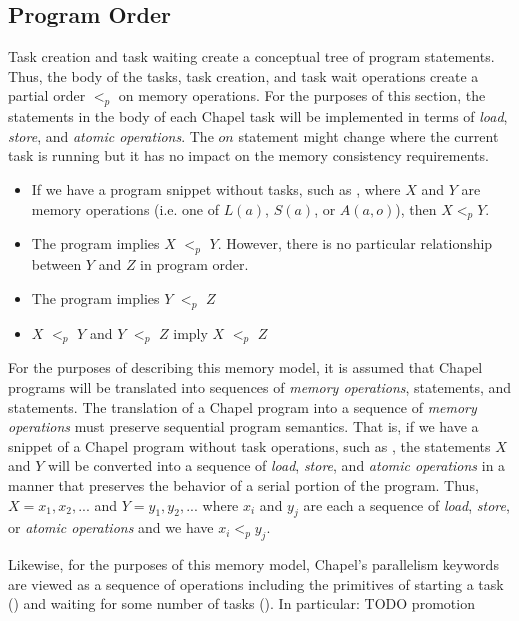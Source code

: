 \subsection{Program Order}
\label{program_order}

Task creation and task waiting create a conceptual tree of program
statements. Thus, the body of the tasks, task creation, and task wait
operations create a partial order $<_p$ on memory operations.  
For the purposes of this section, the statements in the body of each
Chapel task will be implemented in terms of \textit{load}, \textit{store}, and
\textit{atomic operations}. The $on$ statement might change where the current
task is running but it has no impact on the memory consistency requirements.
\begin{itemize}
  \item If we have a program snippet without tasks, such as ,
  where $X$ and $Y$ are memory operations (i.e. one of $L(a)$, $S(a)$, or
  $A(a,o)$), then $X <_p Y$.

  \item The program  implies $X$ $<_p$ $Y$.
  However, there is no particular relationship between $Y$ and $Z$ in
  program order.

  \item The program  implies $Y$ $<_p$ $Z$

  \item $X$ $<_p$ $Y$ and $Y$ $<_p$ $Z$ imply $X$ $<_p$ $Z$

\end{itemize}

For the purposes of describing this memory model, it is assumed that Chapel
programs will be translated into sequences of \textit{memory operations},
 statements, and  statements. The translation of a
Chapel program into a sequence of \textit{memory operations} must preserve
sequential program semantics. That is, if we have a snippet of a Chapel program
without task operations, such as , the statements $X$ and $Y$ will
be converted into a sequence of \textit{load}, \textit{store}, and
\textit{atomic operations} in a manner that preserves the behavior of a serial
portion of the program. Thus, $X=x_1,x_2,...$ and $Y=y_1,y_2,...$ where $x_i$ and
$y_j$ are each a sequence of \textit{load}, \textit{store}, or \textit{atomic
operations} and we have $x_i <_p y_j$.

Likewise, for the purposes of this memory model, Chapel's parallelism keywords
are viewed as a sequence of operations including the primitives of starting a
task () and waiting for some number of tasks
(). In particular: TODO promotion

